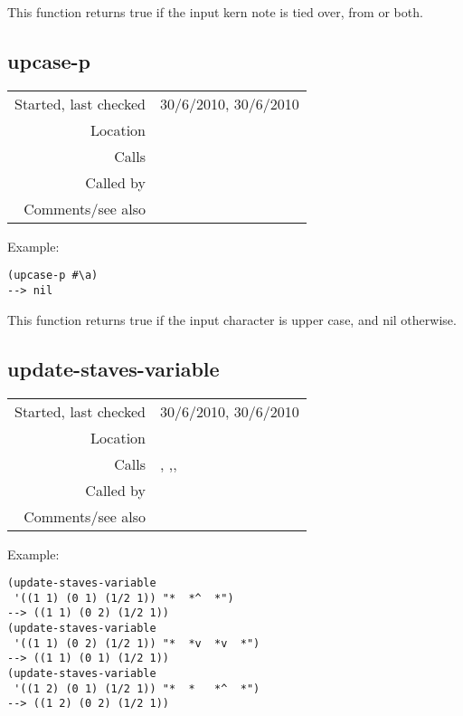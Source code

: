 \noindent This function returns true if the input kern
note is tied over, from or both.


\subsection*{upcase-p}\label{fun:upcase-p}

\vspace{0.3cm}
\begin{tabular}{r|p{8cm}}
Started, last checked & 30/6/2010, 30/6/2010 \\
Location & \nameref{sec:kern} \\
Calls & \\
Called by & \nameref{fun:kern-pitch-chars2pitch-and-octave} \\
Comments/see also &
\end{tabular}

\vspace{0.5cm}
\noindent Example:
\begin{verbatim}
(upcase-p #\a)
--> nil
\end{verbatim}

\noindent This function returns true if the input
character is upper case, and nil otherwise.


\subsection*{update-staves-variable}\label{fun:update-staves-variable}

\vspace{0.3cm}
\begin{tabular}{r|p{8cm}}
Started, last checked & 30/6/2010, 30/6/2010 \\
Location & \nameref{sec:kern} \\
Calls & \nameref{fun:fibonacci-list}, \nameref{fun:index-item-1st-occurs},\newline \nameref{fun:split-or-collapse-index},\newline \nameref{fun:tab-separated-string2list} \\
Called by & \nameref{fun:parse-kern-row} \\
Comments/see also &
\end{tabular}

\vspace{0.5cm}
\noindent Example:
\begin{Verbatim}[showtabs=true]
(update-staves-variable
 '((1 1) (0 1) (1/2 1)) "*	*^	*")
--> ((1 1) (0 2) (1/2 1))
(update-staves-variable
 '((1 1) (0 2) (1/2 1)) "*	*v	*v	*")
--> ((1 1) (0 1) (1/2 1))
(update-staves-variable
 '((1 2) (0 1) (1/2 1)) "*	*	*^	*")
--> ((1 2) (0 2) (1/2 1))
\end{Verbatim}

